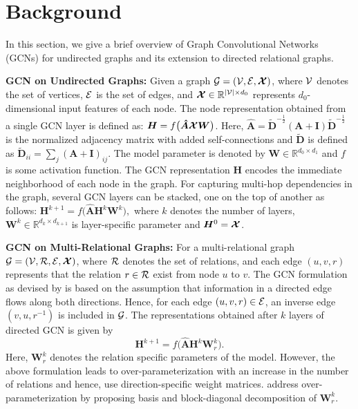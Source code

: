 \documentclass{article} \usepackage{iclr2020_conference,times}
\begin{document}
 \section{Background}
\label{sec:background}


In this section, we give a brief overview of Graph Convolutional Networks (GCNs) for undirected graphs and its extension to directed relational graphs.

\textbf{GCN on Undirected Graphs:}
\label{sec:back_undirected_graph}
Given a graph $\mathcal{G} = (\mathcal{V}, \mathcal{E}, \bm{\mathcal{X}})$, where $\mathcal{V}$ denotes the set of vertices, $\mathcal{E}$ is the set of edges, and $\bm{\mathcal{X}} \in \mathbb{R}^{|\mathcal{V}| \times d_0} $ represents $d_0$-dimensional input features of each node. The node representation obtained from a single GCN layer is defined as:
$ \bm{H} = f\big(\bm{\hat{A}}\bm{\mathcal{X}} \bm{W}\big)$.
Here, $\bm{\hat{A}}=\widetilde{\bm{D}}^{-\frac{1}{2}} (\bm{A} + \bm{I}) \widetilde{\bm{D}}^{-\frac{1}{2}}$ is the normalized adjacency matrix with added self-connections and $\widetilde{\bm{D}}$ is defined as $\widetilde{\bm{D}}_{ii} = \sum_{j}(\bm{A} + \bm{I})_{ij}$. The model parameter is denoted by $\bm{W} \in \mathbb{R}^{d_0 \times d_1}$ and $f$ is some activation function. The GCN representation $\bm{H}$ encodes the immediate neighborhood of each node in the graph. For capturing multi-hop dependencies in the graph, several GCN layers can be stacked, one on the top of another as follows:
$\bm{H}^{k+1} = f\big(\bm{\hat{A}}\bm{H}^{k} \bm{W}^k\big), $
where $k$ denotes the number of layers, $\bm{W}^{k} \in \mathbb{R}^{d_k \times d_{k+1}}$ is layer-specific parameter and $\bm{H}^0 = \bm{\mathcal{X}}$.

\textbf{GCN on Multi-Relational Graphs:}
\label{sec:back_relational_graph}
For a multi-relational graph $\mathcal{G} = (\mathcal{V}, \mathcal{R}, \mathcal{E}, \bm{\mathcal{X}})$, where $\mathcal{R}$ denotes the set of relations, and each edge $(u, v, r)$ represents that the relation $r \in \mathcal{R}$ exist from node $u$ to $v$. The GCN formulation as devised by \citet{gcn_srl} is based on the assumption that information in a directed edge flows along both directions. Hence, for each edge $(u,v,r) \in \mathcal{E}$, an inverse edge $(v,u,r^{-1})$ is included in $\mathcal{G}$. The representations obtained after $k$ layers of directed GCN is given by
\begin{equation}
\label{eq:dir_gcn}
\bm{H}^{k+1} = f\big(\bm{\hat{A}}\bm{H}^{k} \bm{W}_r^k \big)  .
\end{equation}
Here, $\bm{W}_{r}^{k}$ denotes the relation specific parameters of the model. However, the above formulation leads to over-parameterization with an increase in the number of relations and hence, \citet{gcn_srl} use direction-specific weight matrices. \citet{r_gcn} address over-parameterization by proposing basis and block-diagonal decomposition of $\bm{W}_{r}^{k}$.
%
\end{document}
